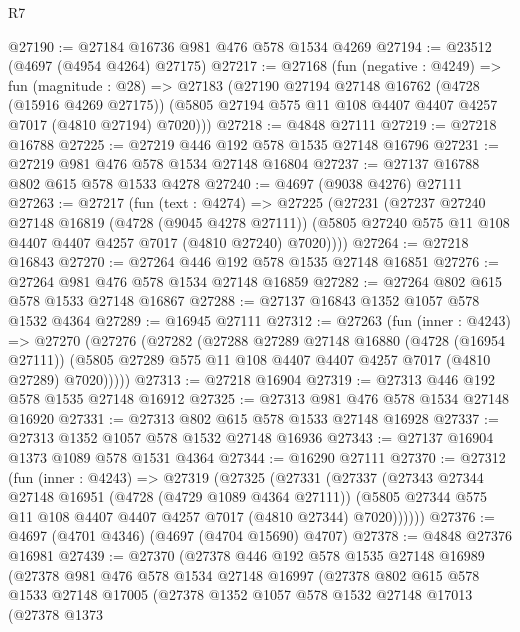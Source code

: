 \begin{lexlean}{R7}
\begin{coremodule}
@27190 := @27184 @16736 @981 @476 @578 @1534 @4269
@27194 := @23512 (@4697 (@4954 @4264) @27175)
@27217 := @27168
    (fun (negative : @4249) =>
    fun (magnitude : @28) =>
    @27183
      (@27190
        @27194
        @27148
        @16762
        (@4728 (@15916 @4269 @27175))
        (@5805 @27194 @575 @11 @108 @4407 @4407 @4257 @7017 (@4810 @27194) @7020)))
@27218 := @4848 @27111
@27219 := @27218 @16788
@27225 := @27219 @446 @192 @578 @1535 @27148 @16796
@27231 := @27219 @981 @476 @578 @1534 @27148 @16804
@27237 := @27137 @16788 @802 @615 @578 @1533 @4278
@27240 := @4697 (@9038 @4276) @27111
@27263 := @27217
    (fun (text : @4274) =>
    @27225
      (@27231
        (@27237
          @27240
          @27148
          @16819
          (@4728 (@9045 @4278 @27111))
          (@5805 @27240 @575 @11 @108 @4407 @4407 @4257 @7017 (@4810 @27240) @7020))))
@27264 := @27218 @16843
@27270 := @27264 @446 @192 @578 @1535 @27148 @16851
@27276 := @27264 @981 @476 @578 @1534 @27148 @16859
@27282 := @27264 @802 @615 @578 @1533 @27148 @16867
@27288 := @27137 @16843 @1352 @1057 @578 @1532 @4364
@27289 := @16945 @27111
@27312 := @27263
    (fun (inner : @4243) =>
    @27270
      (@27276
        (@27282
          (@27288
            @27289
            @27148
            @16880
            (@4728 (@16954 @27111))
            (@5805 @27289 @575 @11 @108 @4407 @4407 @4257 @7017 (@4810 @27289) @7020)))))
@27313 := @27218 @16904
@27319 := @27313 @446 @192 @578 @1535 @27148 @16912
@27325 := @27313 @981 @476 @578 @1534 @27148 @16920
@27331 := @27313 @802 @615 @578 @1533 @27148 @16928
@27337 := @27313 @1352 @1057 @578 @1532 @27148 @16936
@27343 := @27137 @16904 @1373 @1089 @578 @1531 @4364
@27344 := @16290 @27111
@27370 := @27312
    (fun (inner : @4243) =>
    @27319
      (@27325
        (@27331
          (@27337
            (@27343
              @27344
              @27148
              @16951
              (@4728 (@4729 @1089 @4364 @27111))
              (@5805 @27344 @575 @11 @108 @4407 @4407 @4257 @7017 (@4810 @27344) @7020))))))
@27376 := @4697 (@4701 @4346) (@4697 (@4704 @15690) @4707)
@27378 := @4848 @27376 @16981
@27439 := @27370
    (@27378
      @446
      @192
      @578
      @1535
      @27148
      @16989
      (@27378
        @981
        @476
        @578
        @1534
        @27148
        @16997
        (@27378
          @802
          @615
          @578
          @1533
          @27148
          @17005
          (@27378
            @1352
            @1057
            @578
            @1532
            @27148
            @17013
            (@27378
              @1373

\end{coremodule}
\end{lexlean}
